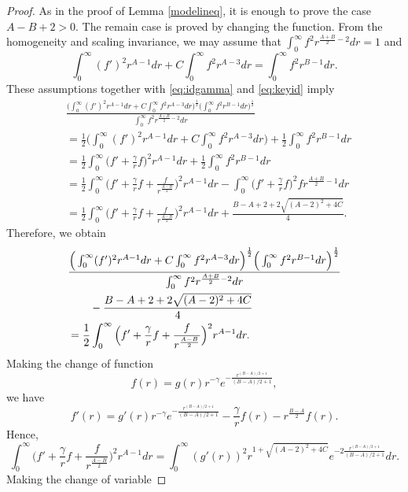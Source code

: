 \documentclass[a4paper,12pt]{article}
\theoremstyle{plain}
\theoremstyle{definition}
\theoremstyle{remark}
\numberwithin{equation}{section}
\begin{document}
\begin{proof}
As in the proof of Lemma \ref{modelineq}, it is enough to prove the case $A-B+2 >0$. The remain case is proved by changing the function. From  the homogeneity and scaling invariance, we may assume that $\int_0^\infty f^2 r^{\frac{A+B}2-2} dr =1$ and 
\[
\int_0^\infty (f')^2 r^{A -1} dr + C \int_0^\infty f^2 r^{A -3} dr =\int_0^\infty f^2 r^{B-1} dr.
\]
These assumptions together with \eqref{eq:idgamma} and \eqref{eq:keyid} imply
\begin{align*}
&\frac{\Big(\int_0^\infty (f')^2 r^{A -1} dr + C \int_0^\infty f^2 r^{A -3} dr\Big)^{\frac12}\Big( \int_0^\infty f^2 r^{B-1} dr\Big)^{\frac12}}{\int_0^\infty f^2 r^{\frac{A+B}2-2} dr}\\
&=\frac12 \Big(\int_0^\infty (f')^2 r^{A -1} dr + C \int_0^\infty f^2 r^{A -3} dr\Big) + \frac12 \int_0^\infty f^2 r^{B-1} dr\\
& =\frac12\int_0^\infty\Big(f' + \frac{\gamma}r f\Big)^2 r^{A-1} dr + \frac12 \int_0^\infty f^2 r^{B-1} dr\\
& = \frac12\int_0^\infty\Big(f' + \frac{\gamma}r f + \frac{f}{r^{\frac{A-B}2}}\Big)^2 r^{A-1} dr - \int_0^\infty\Big(f' + \frac{\gamma}r f\Big)^2 f r^{\frac{A+B}2-1} dr\\
&=\frac12\int_0^\infty\Big(f' + \frac{\gamma}r f + \frac{f}{r^{\frac{A-B}2}}\Big)^2 r^{A-1} dr + \frac{B-A+2 + 2\sqrt{(A-2)^2 + 4C}}4.
\end{align*}
Therefore, we obtain
\begin{align}\label{eq:idkey1}
&\frac{\Big(\int_0^\infty (f')^2 r^{A -1} dr + C \int_0^\infty f^2 r^{A -3} dr\Big)^{\frac12}\Big( \int_0^\infty f^2 r^{B-1} dr\Big)^{\frac12}}{\int_0^\infty f^2 r^{\frac{A+B}2-2} dr}\notag\\
&\qquad -  \frac{B-A+2 + 2\sqrt{(A-2)^2 + 4C}}4\notag\\
&=\frac12\int_0^\infty\Big(f' + \frac{\gamma}r f + \frac{f}{r^{\frac{A-B}2}}\Big)^2 r^{A-1} dr.
\end{align}
Making the change of function
\[
f(r) = g(r) r^{-\gamma} e^{-\frac{r^{(B-A)/2 +1}}{(B-A)/2 +1}},
\]
we have
\[
f'(r) = g'(r) r^{-\gamma} e^{-\frac{r^{(B-A)/2 +1}}{(B-A)/2 +1}} -\frac\gamma r f(r) - r^{\frac{B-A}2} f(r).
\]
Hence, 
\begin{equation}\label{eq:idkey2}
\int_0^\infty\Big(f' + \frac{\gamma}r f + \frac{f}{r^{\frac{A-B}2}}\Big)^2 r^{A-1} dr = \int_0^\infty(g'(r))^2 r^{1 + \sqrt{(A-2)^2 + 4 C}} e^{-2\frac{r^{(B-A)/2 +1}}{(B-A)/2 +1}} dr.
\end{equation} 
Making the change of variable 

\end{proof}
\end{document}
